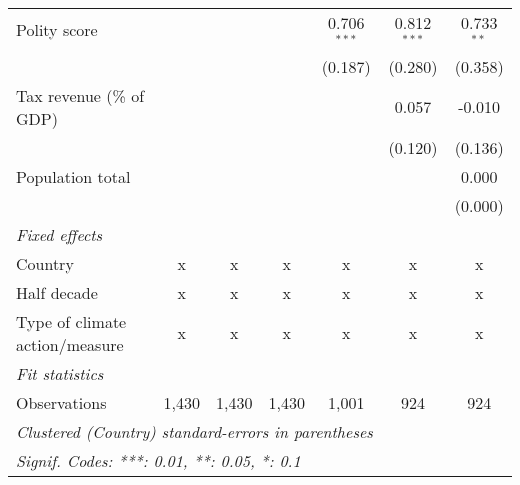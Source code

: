 \begin{tabular}{lcccccc}
   Polity score                                                   &                &                &                & 0.706$^{***}$ & 0.812$^{***}$ & 0.733$^{**}$\\   
                                                                  &                &                &                & (0.187)       & (0.280)       & (0.358)\\   
   Tax revenue (\% of GDP)                                        &                &                &                &               & 0.057         & -0.010\\   
                                                                  &                &                &                &               & (0.120)       & (0.136)\\   
   Population total                                               &                &                &                &               &               & 0.000\\   
                                                                  &                &                &                &               &               & (0.000)\\   
   \emph{Fixed effects}\\
   Country                                                        & x              & x              & x              & x             & x             & x\\  
   Half decade                                                    & x              & x              & x              & x             & x             & x\\  
   Type of climate action/measure                                 & x              & x              & x              & x             & x             & x\\  
   \midrule \emph{Fit statistics}\\
   Observations                                                   & 1,430          & 1,430          & 1,430          & 1,001         & 924           & 924\\  
   \midrule
   \multicolumn{7}{l}{\emph{Clustered (Country) standard-errors in parentheses}}\\
   \multicolumn{7}{l}{\emph{Signif. Codes: ***: 0.01, **: 0.05, *: 0.1}}\\
\end{tabular}
\par\endgroup


